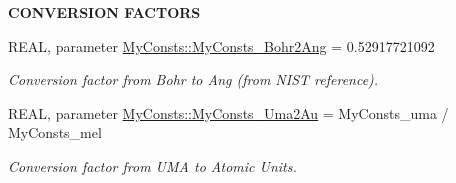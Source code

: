 \begin{Indent}{\bf CONVERSION FACTORS}
\begin{DoxyCompactItemize}
REAL, parameter \hyperlink{namespace_my_consts_a5fc835991a4a417c2bdf1226c1ba2b3a}{MyConsts::MyConsts\_\-Bohr2Ang} = 0.52917721092
\begin{DoxyCompactList}\small\item\em Conversion factor from Bohr to Ang (from NIST reference). \item\end{DoxyCompactList}\item 
REAL, parameter \hyperlink{namespace_my_consts_a36b4ba1dfa259ff5c9eaec55eb5f977f}{MyConsts::MyConsts\_\-Uma2Au} = MyConsts\_\-uma / MyConsts\_\-mel
\begin{DoxyCompactList}\small\item\em Conversion factor from UMA to Atomic Units. \item\end{DoxyCompactList}\end{DoxyCompactItemize}
\end{Indent}

